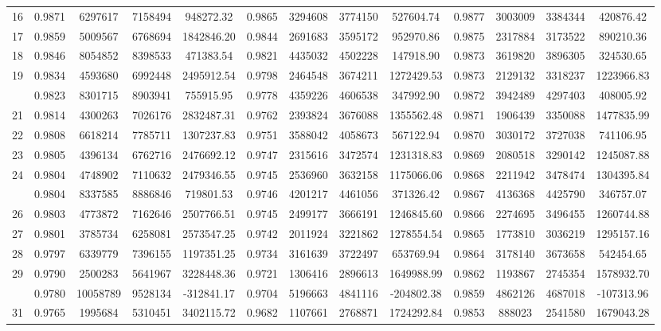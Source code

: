 \documentclass[
  12pt,
]{article}
\begin{document}
\begin{longtable}[t]{lcccccccccccc}
16 & 0.9871 & 6297617 & 7158494 & 948272.32 & 0.9865 & 3294608 & 3774150 & 527604.74 & 0.9877 & 3003009 & 3384344 & 420876.42\\
17 & 0.9859 & 5009567 & 6768694 & 1842846.20 & 0.9844 & 2691683 & 3595172 & 952970.86 & 0.9875 & 2317884 & 3173522 & 890210.36\\
18 & 0.9846 & 8054852 & 8398533 & 471383.54 & 0.9821 & 4435032 & 4502228 & 147918.90 & 0.9873 & 3619820 & 3896305 & 324530.65\\
19 & 0.9834 & 4593680 & 6992448 & 2495912.54 & 0.9798 & 2464548 & 3674211 & 1272429.53 & 0.9873 & 2129132 & 3318237 & 1223966.83\\
\addlinespace
20 & 0.9823 & 8301715 & 8903941 & 755915.95 & 0.9778 & 4359226 & 4606538 & 347992.90 & 0.9872 & 3942489 & 4297403 & 408005.92\\
21 & 0.9814 & 4300263 & 7026176 & 2832487.31 & 0.9762 & 2393824 & 3676088 & 1355562.48 & 0.9871 & 1906439 & 3350088 & 1477835.99\\
22 & 0.9808 & 6618214 & 7785711 & 1307237.83 & 0.9751 & 3588042 & 4058673 & 567122.94 & 0.9870 & 3030172 & 3727038 & 741106.95\\
23 & 0.9805 & 4396134 & 6762716 & 2476692.12 & 0.9747 & 2315616 & 3472574 & 1231318.83 & 0.9869 & 2080518 & 3290142 & 1245087.88\\
24 & 0.9804 & 4748902 & 7110632 & 2479346.55 & 0.9745 & 2536960 & 3632158 & 1175066.06 & 0.9868 & 2211942 & 3478474 & 1304395.84\\
\addlinespace
25 & 0.9804 & 8337585 & 8886846 & 719801.53 & 0.9746 & 4201217 & 4461056 & 371326.42 & 0.9867 & 4136368 & 4425790 & 346757.07\\
26 & 0.9803 & 4773872 & 7162646 & 2507766.51 & 0.9745 & 2499177 & 3666191 & 1246845.60 & 0.9866 & 2274695 & 3496455 & 1260744.88\\
27 & 0.9801 & 3785734 & 6258081 & 2573547.25 & 0.9742 & 2011924 & 3221862 & 1278554.54 & 0.9865 & 1773810 & 3036219 & 1295157.16\\
28 & 0.9797 & 6339779 & 7396155 & 1197351.25 & 0.9734 & 3161639 & 3722497 & 653769.94 & 0.9864 & 3178140 & 3673658 & 542454.65\\
29 & 0.9790 & 2500283 & 5641967 & 3228448.36 & 0.9721 & 1306416 & 2896613 & 1649988.99 & 0.9862 & 1193867 & 2745354 & 1578932.70\\
\addlinespace
30 & 0.9780 & 10058789 & 9528134 & -312841.17 & 0.9704 & 5196663 & 4841116 & -204802.38 & 0.9859 & 4862126 & 4687018 & -107313.96\\
31 & 0.9765 & 1995684 & 5310451 & 3402115.72 & 0.9682 & 1107661 & 2768871 & 1724292.84 & 0.9853 & 888023 & 2541580 & 1679043.28\\

\end{longtable}
\end{document}
